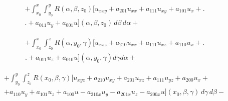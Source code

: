 \vspace{-5mm}


\begin{multline*}


+\int_{x_{0}}^{x} \int_{y_{0}}^{y} R(\alpha,\beta,z_{0})


\bigl[u_{xxy}+a_{201}u_{xx}+a_{111}u_{xy}+ a_{101}u_{x}+\bigr.\\


\bigl.+a_{011}u_{y}


+a_{001}u\bigr](\alpha,\beta,z_{0}) \,d\beta \,d\alpha+


\end{multline*}





\vspace{-5mm}


\begin{multline*}


+\int_{x_{0}}^{x} \int_{z_{0}}^{z} R(\alpha,y_{0}, \gamma)


\bigl[u_{xxz}+a_{210}u_{xx}+a_{111}u_{xz}+a_{110}u_{x}+\bigr.\\


\bigl.+a_{011}u_{z}


+a_{010}u\bigr](\alpha,y_{0}, \gamma) d\gamma d\alpha+


\end{multline*}





\vspace{-5mm}


\begin{multline*}


+\int_{y_{0}}^{y} \int_{z_{0}}^{z} R(x_{0}, \beta,\gamma)


\bigl[u_{xyz}+a_{210}u_{xy}+a_{201}u_{xz}+a_{111}u_{yz}+a_{200}u_{x}+


\\


+a_{110}u_{y}+a_{101}u_{z}+a_{100}u-a_{210x}u_{y}-a_{201x}u_{z}-a_{200x}u]


(x_{0}, \beta,\gamma) \,d\gamma \,d\beta-


\end{multline*}





\vspace{-5mm}


